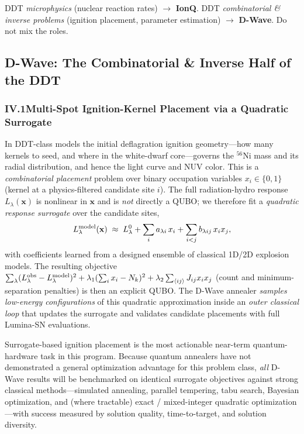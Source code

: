 \documentclass[11pt]{article}
\begin{document}
\begin{keybox}
DDT \emph{microphysics} (nuclear reaction rates) $\rightarrow$ \textbf{IonQ}. \quad
DDT \emph{combinatorial \& inverse problems} (ignition placement, parameter estimation)
$\rightarrow$ \textbf{D-Wave}. \;Do not mix the roles.
\end{keybox}

\subsection{D-Wave: The Combinatorial \& Inverse Half of the DDT}

\subsubsection*{IV.1\quad Multi-Spot Ignition-Kernel Placement via a Quadratic Surrogate}
In DDT-class models the initial deflagration ignition geometry---how many kernels to seed, and where
in the white-dwarf core---governs the $^{56}$Ni mass and its radial distribution, and hence the
light curve and NUV color. This is a \emph{combinatorial placement} problem over binary occupation
variables $x_i\in\{0,1\}$ (kernel at a physics-filtered candidate site $i$). The full radiation-hydro
response $L_\lambda(\mathbf{x})$ is nonlinear in $\mathbf{x}$ and is \emph{not} directly a QUBO; we
therefore fit a \emph{quadratic response surrogate} over the candidate sites,
\begin{equation}
L_\lambda^{\rm model}(\mathbf{x}) \;\approx\; L_\lambda^{0} + \sum_i a_{\lambda i}\,x_i
   + \sum_{i<j} b_{\lambda ij}\,x_i x_j ,
\end{equation}
with coefficients learned from a designed ensemble of classical 1D/2D explosion models. The resulting
objective $\sum_\lambda(L_\lambda^{\rm obs}-L_\lambda^{\rm model})^2 + \lambda_1(\sum_i x_i-N_k)^2 +
\lambda_2\sum_{\langle ij\rangle}J_{ij}x_i x_j$ (count and minimum-separation penalties) is then an
explicit QUBO. The D-Wave annealer \emph{samples low-energy configurations} of this quadratic
approximation inside an \emph{outer classical loop} that updates the surrogate and validates
candidate placements with full Lumina-SN evaluations.

\begin{qbox}
Surrogate-based ignition placement is the most actionable near-term quantum-hardware task in this
program. Because quantum annealers have not demonstrated a general optimization advantage for this
problem class, \emph{all} D-Wave results will be benchmarked on identical surrogate objectives
against strong classical methods---simulated annealing, parallel tempering, tabu search, Bayesian
optimization, and (where tractable) exact / mixed-integer quadratic optimization---with success
measured by solution quality, time-to-target, and solution diversity.
\end{qbox}
\end{document}
